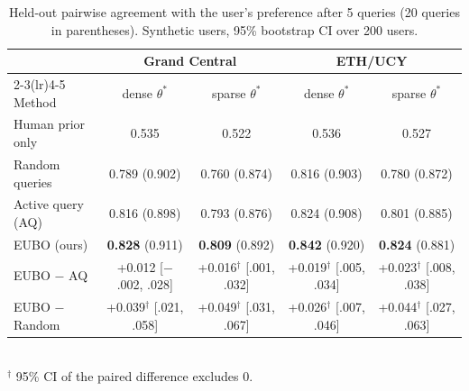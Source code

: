\begin{table}[t]
\centering
\caption{Held-out pairwise agreement with the user's preference after 5 queries (20 queries in parentheses). Synthetic users, 95\% bootstrap CI over 200 users.}
\label{tab:main}
\setlength{\tabcolsep}{4pt}
\begin{tabular}{lcccc}
\toprule
 & \multicolumn{2}{c}{Grand Central} & \multicolumn{2}{c}{ETH/UCY} \\
\cmidrule(lr){2-3}\cmidrule(lr){4-5}
Method & dense $\theta^*$ & sparse $\theta^*$ & dense $\theta^*$ & sparse $\theta^*$ \\
\midrule
Human prior only    & 0.535 & 0.522 & 0.536 & 0.527 \\
Random queries      & 0.789 \scriptsize{(0.902)} & 0.760 \scriptsize{(0.874)} & 0.816 \scriptsize{(0.903)} & 0.780 \scriptsize{(0.872)} \\
Active query (AQ)   & 0.816 \scriptsize{(0.898)} & 0.793 \scriptsize{(0.876)} & 0.824 \scriptsize{(0.908)} & 0.801 \scriptsize{(0.885)} \\
EUBO (ours)         & \textbf{0.828} \scriptsize{(0.911)} & \textbf{0.809} \scriptsize{(0.892)} & \textbf{0.842} \scriptsize{(0.920)} & \textbf{0.824} \scriptsize{(0.881)} \\
\midrule
EUBO $-$ AQ         & +0.012 \scriptsize{[$-$.002, .028]} & +0.016$^\dagger$ \scriptsize{[.001, .032]} & +0.019$^\dagger$ \scriptsize{[.005, .034]} & +0.023$^\dagger$ \scriptsize{[.008, .038]} \\
EUBO $-$ Random     & +0.039$^\dagger$ \scriptsize{[.021, .058]} & +0.049$^\dagger$ \scriptsize{[.031, .067]} & +0.026$^\dagger$ \scriptsize{[.007, .046]} & +0.044$^\dagger$ \scriptsize{[.027, .063]} \\
\bottomrule
\end{tabular}
\\[2pt]{\scriptsize $^\dagger$ 95\% CI of the paired difference excludes 0.}
\end{table}
